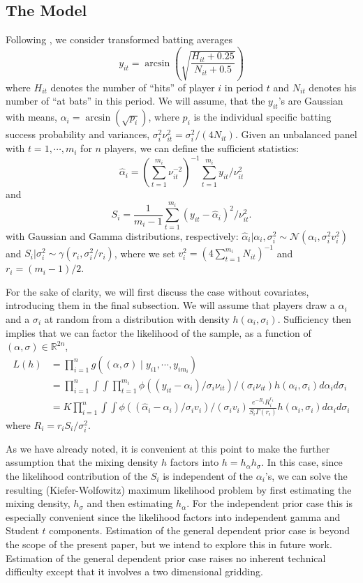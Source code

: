 \documentclass[12pt]{amsart}
\def\RR{\mathbb{R}}
\def\NN{\mathcal N}
\begin{document}
\subsection{The Model}
Following , we consider transformed batting averages
\[
y_{it} = \arcsin \left ( \sqrt{\frac{H_{it} + 0.25}{N_{it} + 0.5}} \right )
\]
where $H_{it}$ denotes the number of ``hits'' of player $i$ in period $t$
and $N_{it}$ denotes his number of ``at bats'' in this period.  We will
assume, that the $y_{it}$'s are 
Gaussian with means, $\alpha_i = \arcsin(\sqrt{p_i})$, 
where $p_i$ is the individual specific batting success probability and variances,
$\sigma_i^2 \nu_{it}^2 = \sigma_i^2 / (4 N_{it})$.  Given an unbalanced panel 
with $t = 1, \cdots , m_i$ for $n$ players, we can define the sufficient 
statistics:
\[
\hat \alpha_i = (\sum_{t=1}^{m_i} \nu_{it}^{-2})^{-1}
\sum_{t=1}^{m_i} y_{it}/ \nu_{it}^2 
\]
and 
\[
S_i = \frac{1}{m_i -1} \sum_{t=1}^{m_i} (y_{it} - \hat \alpha_i)^2 /\nu_{it}^2.
\]
with Gaussian and Gamma distributions, respectively:
$\hat \alpha_i | \alpha_i , \sigma_i^2 \sim 
\NN ( \alpha_i , \sigma_i^2 v_i^2 )$ 
and $S_i | \sigma_i^2 \sim \gamma (r_i , \sigma_i^2/r_i)$,  where we set
$v_i^2 =  (4 \sum_{t=1}^{m_i} N_{it})^{-1}$ and $r_i = (m_i - 1)/2$.

For the sake of clarity, we will first discuss the case without covariates, 
introducing them in the final subsection.
We will assume that players draw a $\alpha_i$ and a $\sigma_i$ at random
from a distribution with density $h(\alpha_i , \sigma_i )$. 
Sufficiency then implies that we can factor the likelihood of the sample,
as a function of $(\alpha , \sigma ) \in \RR^{2n}$,
\begin{align*}
L(h)  &= \prod_{i=1}^n g ( (\alpha , \sigma )  \; | \; 
y_{i1} , \cdots , y_{im_i} )\\ 
&= \prod_{i=1}^n \int \int \prod_{t=1}^{m_i} \phi (( y_{it} - \alpha_i )/ 
\sigma_i \nu_{it} ) / (\sigma_i \nu_{it}) h(\alpha_i , \sigma_i ) 
d\alpha_i d\sigma_i \\
&= K \prod_{i=1}^n \int \int 
\phi (( \hat \alpha_{i} - \alpha_i )/ 
\sigma_i v_{i} ) / (\sigma_i v_{i}) 
\frac{e^{-R_i} R_i^{r_i}}{S_i \Gamma(r_i)}
h(\alpha_i , \sigma_i ) d\alpha_i d\sigma_i 
\end{align*}
where $R_i = r_i S_i / \sigma_i^2$.

As we have already noted, 
it is convenient at this point to make the further assumption that the
mixing density $h$ factors into $h = h_\alpha h_\sigma$.  In this case,
since the likelihood contribution of the $S_i$ is independent of the 
$\alpha_i$'s, we can solve the resulting (Kiefer-Wolfowitz) maximum
likelihood problem by first estimating the mixing density, 
$h_\sigma$ and  then estimating $h_\alpha$.  For the independent prior
case this is especially convenient since the likelihood factors into
independent gamma and Student $t$ components.  Estimation of the general
dependent prior case is beyond the scope of the present paper, but we
intend to explore this in future work. Estimation of the general dependent 
prior case raises no inherent technical difficulty except that it involves 
a two dimensional gridding.
\end{document}
